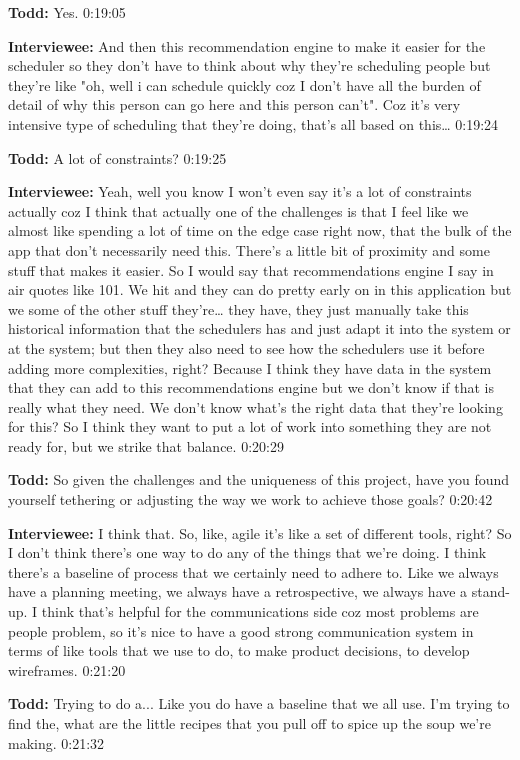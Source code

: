 \textbf{Todd:} Yes.   0:19:05

\textbf{Interviewee:} And then this recommendation engine to make it easier for the scheduler so they don't have to think about why they're scheduling people but they're like "oh, well i can schedule quickly coz I don't have all the burden of detail of why this person can go here and this person can't".  Coz it's very intensive type of scheduling that they're doing, that's all based on this…   0:19:24

\textbf{Todd:} A lot of constraints?   0:19:25

\textbf{Interviewee:} Yeah, well you know I won't even say it's a lot of constraints actually coz I think that actually one of the challenges is that I feel like we almost like spending a lot of time on the edge case right now, that the bulk of the app that don't necessarily need this.  There's a little bit of proximity and some stuff that makes it easier. So I would say that recommendations engine I say in air quotes like 101.  We hit and they can do pretty early on in this application but we some of the other stuff they're… they have, they just manually take this historical information that the schedulers has and just adapt it into the system or at the system; but then they also need to see how the schedulers use it before adding more complexities, right?  Because I think they have data in the system that they can add to this recommendations engine but we don't know if that is really what they need. We don't know what's the right data that they're looking for this?  So I think they want to put a lot of work into something they are not ready for, but we strike that balance.  0:20:29

\textbf{Todd:} So given the challenges and the uniqueness of this project, have you found yourself tethering or adjusting the way we work to achieve those goals?  0:20:42

\textbf{Interviewee:} I think that.  So, like, agile it's like a set of different tools, right? So I don't think there's one way to do any of the things that we're doing.  I think there's a baseline of process that we certainly need to adhere to.  Like we always have a planning meeting, we always have a retrospective, we always have a stand-up.  I think that's helpful for the communications side coz most problems are people problem, so it's nice to have a good strong communication system in terms of like tools that we use to do, to make product decisions, to develop wireframes.  0:21:20

\textbf{Todd:} Trying to do a...  Like you do have a baseline that we all use.  I'm trying to find the, what are the little recipes that you pull off to spice up the soup we're making.   0:21:32

